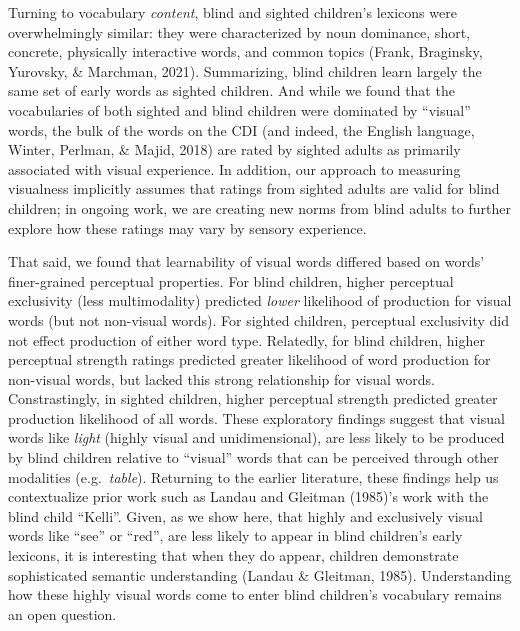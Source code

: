 \documentclass[
  man,floatsintext]{apa6}
\begin{document}
Turning to vocabulary \emph{content}, blind and sighted children's lexicons were overwhelmingly similar: they were characterized by noun dominance, short, concrete, physically interactive words, and common topics (Frank, Braginsky, Yurovsky, \& Marchman, 2021). Summarizing, blind children learn largely the same set of early words as sighted children. And while we found that the vocabularies of both sighted and blind children were dominated by ``visual'' words, the bulk of the words on the CDI (and indeed, the English language, Winter, Perlman, \& Majid, 2018) are rated by sighted adults as primarily associated with visual experience. In addition, our approach to measuring visualness implicitly assumes that ratings from sighted adults are valid for blind children; in ongoing work, we are creating new norms from blind adults to further explore how these ratings may vary by sensory experience.

That said, we found that learnability of visual words differed based on words' finer-grained perceptual properties. For blind children, higher perceptual exclusivity (less multimodality) predicted \emph{lower} likelihood of production for visual words (but not non-visual words). For sighted children, perceptual exclusivity did not effect production of either word type. Relatedly, for blind children, higher perceptual strength ratings predicted greater likelihood of word production for non-visual words, but lacked this strong relationship for visual words. Constrastingly, in sighted children, higher perceptual strength predicted greater production likelihood of all words. These exploratory findings suggest that visual words like \emph{light} (highly visual and unidimensional), are less likely to be produced by blind children relative to ``visual'' words that can be perceived through other modalities (e.g.~\emph{table}). Returning to the earlier literature, these findings help us contextualize prior work such as Landau and Gleitman (1985)'s work with the blind child ``Kelli''. Given, as we show here, that highly and exclusively visual words like ``see'' or ``red'', are less likely to appear in blind children's early lexicons, it is interesting that when they do appear, children demonstrate sophisticated semantic understanding (Landau \& Gleitman, 1985). Understanding how these highly visual words come to enter blind children's vocabulary remains an open question.
\end{document}
